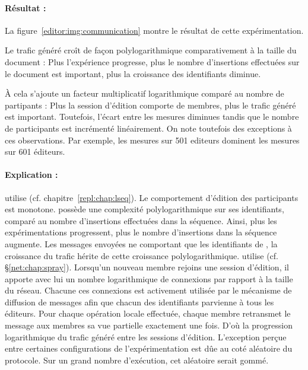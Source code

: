 \paragraph{Résultat :} La figure~\ref{editor:img:communication} montre le
résultat de cette expérimentation.
\begin{inparaenum}[(i)]
\item Le trafic généré croît de façon polylogarithmique comparativement à la
  taille du document : Plus l'expérience progresse, plus le nombre d'insertions
  effectuées sur le document est important, plus la croissance des identifiants
  diminue.
\item À cela s'ajoute un facteur multiplicatif logarithmique comparé au nombre
  de partipants : Plus la session d'édition comporte de membres, plus le trafic
  généré est important. Toutefois, l'écart entre les mesures diminues tandis que
  le nombre de participants est incrémenté linéairement. On note toutefois des
  exceptions à ces observations. Par exemple, les mesures sur 501 editeurs
  dominent les mesures sur 601 éditeurs.
\end{inparaenum}

\paragraph{Explication :} \CRATE utilise \LSEQ
(cf. chapitre~\ref{repl:chap:lseq}). Le comportement d'édition des participants
est monotone. \LSEQ possède une complexité polylogarithmique sur ses
identifiants, comparé au nombre d'insertions effectuées dans la séquence. Ainsi,
plus les expérimentations progressent, plus le nombre d'insertions dans la
séquence augmente. Les messages envoyées ne comportant que les identifiants de
\LSEQ, la croissance du trafic hérite de cette croissance
polylogarithmique. \CRATE utilise \SPRAY
(cf. §\ref{net:chap:spray}). Lorsqu'un nouveau membre rejoins une
session d'édition, il apporte avec lui un nombre logarithmique de connexions par
rapport à la taille du réseau. Chacune ces connexions est activement utilisée
par le mécanisme de diffusion de messages afin que chacun des identifiants
parvienne à tous les éditeurs. Pour chaque opération locale effectuée, chaque
membre retransmet le message aux membres sa vue partielle exactement une
fois. D'où la progression logarithmique du trafic généré entre les sessions
d'édition. L'exception perçue entre certaines configurations de
l'expérimentation est dûe au coté aléatoire du protocole. Sur un grand nombre
d'exécution, cet aléatoire serait gommé.


